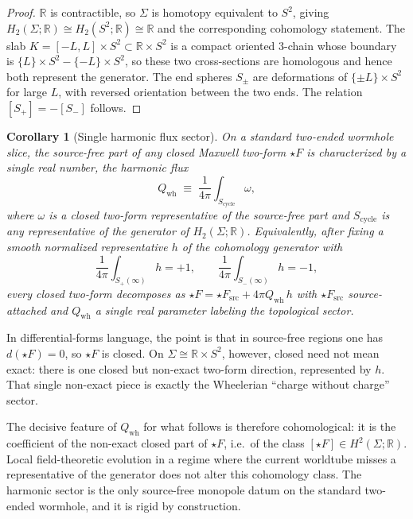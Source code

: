 \documentclass[aps,prd,onecolumn,nofootinbib,superscriptaddress]{revtex4-2}
\newtheorem{corollary}{Corollary}
\begin{document}
\begin{proof}
$\mathbb{R}$ is contractible, so $\Sigma$ is homotopy equivalent to $S^2$, giving $H_2(\Sigma;\mathbb{R}) \cong H_2(S^2;\mathbb{R}) \cong \mathbb{R}$ and the corresponding cohomology statement. The slab $K = [-L,L]\times S^2 \subset \mathbb{R}\times S^2$ is a compact oriented 3-chain whose boundary is $\{L\}\times S^2 - \{-L\}\times S^2$, so these two cross-sections are homologous and hence both represent the generator. The end spheres $S_\pm$ are deformations of $\{\pm L\}\times S^2$ for large $L$, with reversed orientation between the two ends. The relation $[S_+] = -[S_-]$ follows.
\end{proof}

\begin{corollary}[Single harmonic flux sector]
\label{cor:single-sector}
On a standard two-ended wormhole slice, the source-free part of any closed Maxwell two-form $\star F$ is characterized by a single real number, the harmonic flux
\begin{equation}
Q_{\mathrm{wh}} \;\equiv\; \frac{1}{4\pi}\int_{S_\mathrm{cycle}} \omega,
\end{equation}
where $\omega$ is a closed two-form representative of the source-free part and $S_\mathrm{cycle}$ is any representative of the generator of $H_2(\Sigma;\mathbb{R})$. Equivalently, after fixing a smooth normalized representative $h$ of the cohomology generator with
\begin{equation}
\frac{1}{4\pi}\int_{S_+(\infty)} h = +1,\qquad \frac{1}{4\pi}\int_{S_-(\infty)} h = -1,
\end{equation}
every closed two-form decomposes as $\star F = \star F_{\mathrm{src}} + 4\pi Q_{\mathrm{wh}}\, h$ with $\star F_{\mathrm{src}}$ source-attached and $Q_{\mathrm{wh}}$ a single real parameter labeling the topological sector.
\end{corollary}

In differential-forms language, the point is that in source-free regions one has $d(\star F)=0$, so $\star F$ is closed. On $\Sigma \cong \mathbb{R}\times S^2$, however, closed need not mean exact: there is one closed but non-exact two-form direction, represented by $h$. That single non-exact piece is exactly the Wheelerian ``charge without charge'' sector.

The decisive feature of $Q_{\mathrm{wh}}$ for what follows is therefore cohomological: it is the coefficient of the non-exact closed part of $\star F$, i.e.\ of the class $[\star F]\in H^2(\Sigma;\mathbb{R})$. Local field-theoretic evolution in a regime where the current worldtube misses a representative of the generator does not alter this cohomology class. The harmonic sector is the only source-free monopole datum on the standard two-ended wormhole, and it is rigid by construction.
\end{document}
